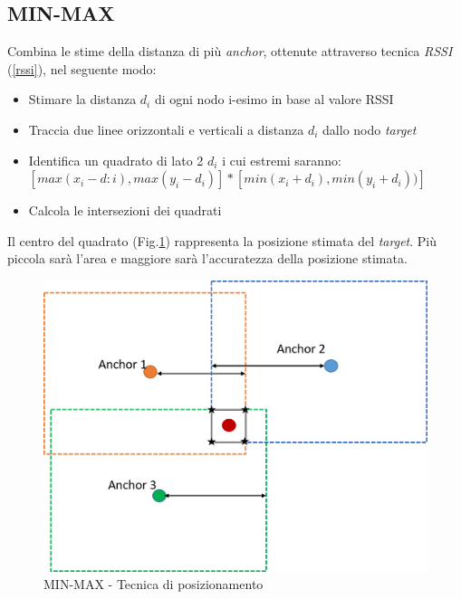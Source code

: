 \subsection{MIN-MAX}
Combina le stime della distanza di più \textit{anchor}, ottenute attraverso tecnica \textit{RSSI} (\ref{rssi}), nel seguente modo:

\begin{itemize}
	\item Stimare la distanza $d_i$ di ogni nodo i-esimo in base al valore RSSI
	\item Traccia due linee orizzontali e verticali a distanza $d_i$ dallo nodo \textit{target}
	\item Identifica un quadrato di lato 2  $d_i$ i cui estremi saranno: \\
			$[max(x_i-d:i),max(y_i-d_i)] * [min(x_i+d_i),min(y_i+d_i))]$
	\item Calcola le intersezioni dei quadrati
\end{itemize}

Il centro del quadrato (Fig.\ref{fig:minmax}) rappresenta la posizione stimata del \textit{target}. Più piccola sarà l’area e maggiore sarà l’accuratezza della posizione stimata.
\begin{figure}[H]  
	\centering 
	\includegraphics[scale=0.4]{ContestoApplicativo/minmax.png}
	\caption{MIN-MAX - Tecnica di posizionamento }
	\label{fig:minmax}
\end{figure}




